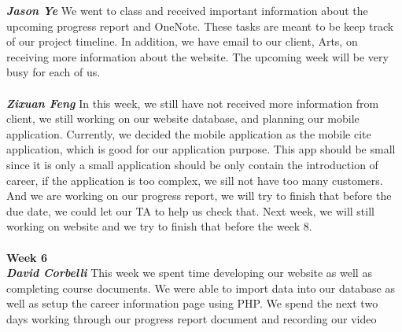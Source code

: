 \documentclass[onecolumn, draftclsnofoot,10pt, compsoc]{IEEEtran}
\begin{document}
\textbf{\textit{Jason Ye}}
We went to class and received important information about the upcoming progress report and OneNote. These tasks are meant to be keep track of our project timeline. In addition, we have email to our client, Arts, on receiving more information about the website. The upcoming week will be very busy for each of us.\\ \\
\textbf{\textit{Zixuan Feng}}
In this week, we still have not received more information from client, we still working on our website database, and planning our mobile application. Currently, we decided the mobile application as the mobile cite application, which is good for our application purpose. This app should be small since it is only a small application should be only contain the introduction of career, if the application is too complex, we sill not have too many customers. And we are working on our progress report, we will try to finish that before the due date, we could let our TA to help us check that. Next week, we will still working on website and we try to finish that before the week 8.\\ \\
\textbf{Week 6}
\\ \textbf{\textit{David Corbelli}}
This week we spent time developing our website as well as completing course documents. We were able to import data into our database as well as setup the career information page using PHP. We spend the next two days working through our progress report document and recording our video\\ \\
\end{document}
